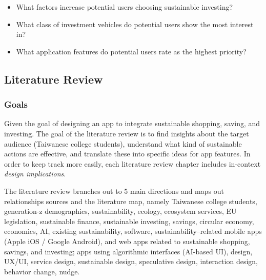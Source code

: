 \documentclass[
  letterpaper,
  DIV=11,
  numbers=noendperiod]{scrartcl}
\begin{document}
\begin{itemize}
\item
  What factors increase potential users choosing sustainable investing?
\item
  What class of investment vehicles do potential users show the most
  interest in?
\item
  What application features do potential users rate as the highest
  priority?
\end{itemize}

\newpage

\subsection{Literature Review}\label{literature-review}

\subsubsection{Goals}\label{goals}

Given the goal of designing an app to integrate sustainable shopping,
saving, and investing. The goal of the literature review is to find
insights about the target audience (Taiwanese college students),
understand what kind of sustainable actions are effective, and translate
these into specific ideas for app features. In order to keep track more
easily, each literature review chapter includes in-context \emph{design
implications}.

The literature review branches out to 5 main directions and maps out
relationships sources and the literature map, namely Taiwanese college
students, generation-z demographics, sustainability, ecology, ecosystem
services, EU legislation, sustainable finance, sustainable investing,
savings, circular economy, economics, AI, existing sustainability,
software, sustainability--related mobile apps (Apple iOS / Google
Android), and web apps related to sustainable shopping, savings, and
investing; apps using algorithmic interfaces (AI-based UI), design,
UX/UI, service design, sustainable design, speculative design,
interaction design, behavior change, nudge.
\end{document}
